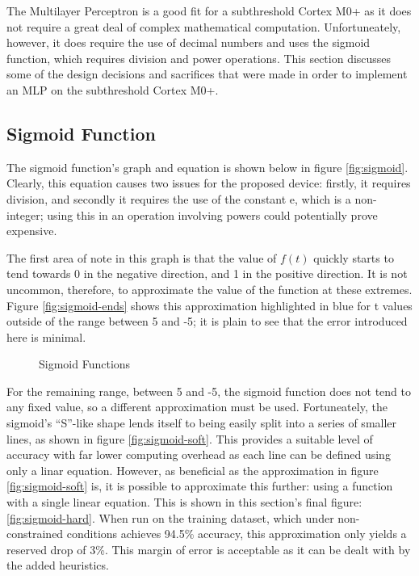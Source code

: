 
The Multilayer Perceptron is a good fit for a subthreshold Cortex M0+ as it does not require a great deal of complex mathematical computation. Unfortuneately, however, it does require the use of decimal numbers and uses the sigmoid function, which requires division and power operations. This section discusses some of the design decisions and sacrifices that were made in order to implement an MLP on the subthreshold Cortex M0+.

\subsection{Sigmoid Function}
The sigmoid function's graph and equation is shown below in figure \ref{fig:sigmoid}. Clearly, this equation causes two issues for the proposed device: firstly, it requires division, and secondly it requires the use of the constant e, which is a non-integer; using this in an operation involving powers could potentially prove expensive.

The first area of note in this graph is that the value of $f(t)$ quickly starts to tend towards 0 in the negative direction, and 1 in the positive direction. It is not uncommon, therefore, to approximate the value of the function at these extremes. Figure \ref{fig:sigmoid-ends} shows this approximation highlighted in blue for t values outside of the range between 5 and -5; it is plain to see that the error introduced here is minimal.

\begin{figure}[!h]
    \centering
    \caption{Sigmoid Functions \label{fig:sigmoid-options}}
\end{figure}

For the remaining range, between 5 and -5, the sigmoid function does not tend to any fixed value, so a different approximation must be used. Fortuneately, the sigmoid's ``S''-like shape lends itself to being easily split into a series of smaller lines, as shown in figure \ref{fig:sigmoid-soft}. This provides a suitable level of accuracy with far lower computing overhead as each line can be defined using only a linar equation. However, as beneficial as the approximation in figure \ref{fig:sigmoid-soft} is, it is possible to approximate this further: using a function with a single linear equation. This is shown in this section's final figure: \ref{fig:sigmoid-hard}. When run on the training dataset, which under non-constrained conditions achieves 94.5\% accuracy, this approximation only yields a reserved drop of 3\%. This margin of error is acceptable as it can be dealt with by the added heuristics.

